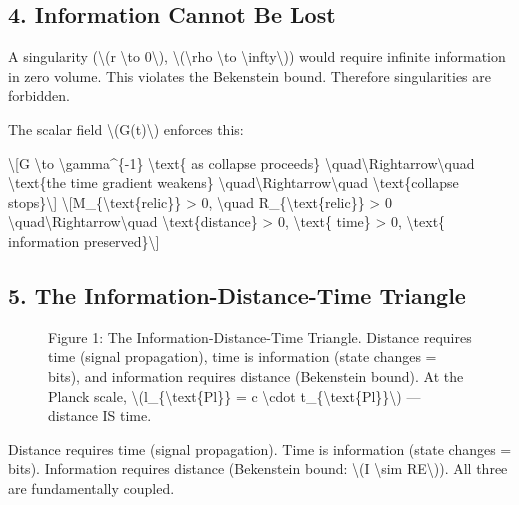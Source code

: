 \documentclass[
  10pt,
]{article}
\begin{document}
\hypertarget{information-cannot-be-lost}{%
\subsection{4. Information Cannot Be
Lost}\label{information-cannot-be-lost}}

A singularity (\textbackslash(r \textbackslash to 0\textbackslash),
\textbackslash(\textbackslash rho \textbackslash to
\textbackslash infty\textbackslash)) would require infinite information
in zero volume. This violates the Bekenstein bound. Therefore
singularities are forbidden.

The scalar field \textbackslash(G(t)\textbackslash) enforces this:

\textbackslash{[}G \textbackslash to \textbackslash gamma\^{}\{-1\}
\textbackslash text\{ as collapse proceeds\}
\textbackslash quad\textbackslash Rightarrow\textbackslash quad
\textbackslash text\{the time gradient weakens\}
\textbackslash quad\textbackslash Rightarrow\textbackslash quad
\textbackslash text\{collapse stops\}\textbackslash{]}
\textbackslash{[}M\_\{\textbackslash text\{relic\}\} \textgreater{} 0,
\textbackslash quad R\_\{\textbackslash text\{relic\}\} \textgreater{} 0
\textbackslash quad\textbackslash Rightarrow\textbackslash quad
\textbackslash text\{distance\} \textgreater{} 0, \textbackslash text\{
time\} \textgreater{} 0, \textbackslash text\{ information
preserved\}\textbackslash{]}

\hypertarget{the-information-distance-time-triangle}{%
\subsection{5. The Information-Distance-Time
Triangle}\label{the-information-distance-time-triangle}}

\begin{figure}
\centering

\caption{Figure 1: The Information-Distance-Time Triangle. Distance
requires time (signal propagation), time is information (state changes =
bits), and information requires distance (Bekenstein bound). At the
Planck scale, \textbackslash(l\_\{\textbackslash text\{Pl\}\} = c
\textbackslash cdot t\_\{\textbackslash text\{Pl\}\}\textbackslash) ---
distance IS time.}
\end{figure}

Distance requires time (signal propagation). Time is information (state
changes = bits). Information requires distance (Bekenstein bound:
\textbackslash(I \textbackslash sim RE\textbackslash)). All three are
fundamentally coupled.
\end{document}
